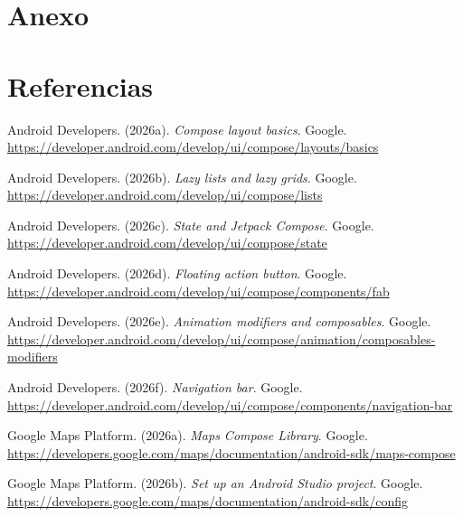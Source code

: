 \documentclass[12pt,a4paper]{article}
\begin{document}
\clearpage
\section{Anexo}
\vfill
\clearpage
\section{Referencias}

\setlength{\parindent}{0pt}

Android Developers. (2026a). \textit{Compose layout basics}. Google.\\
\url{https://developer.android.com/develop/ui/compose/layouts/basics}

Android Developers. (2026b). \textit{Lazy lists and lazy grids}. Google.\\
\url{https://developer.android.com/develop/ui/compose/lists}

Android Developers. (2026c). \textit{State and Jetpack Compose}. Google.\\
\url{https://developer.android.com/develop/ui/compose/state}

Android Developers. (2026d). \textit{Floating action button}. Google.\\
\url{https://developer.android.com/develop/ui/compose/components/fab}

Android Developers. (2026e). \textit{Animation modifiers and composables}. Google.\\
\url{https://developer.android.com/develop/ui/compose/animation/composables-modifiers}

Android Developers. (2026f). \textit{Navigation bar}. Google.\\
\url{https://developer.android.com/develop/ui/compose/components/navigation-bar}

Google Maps Platform. (2026a). \textit{Maps Compose Library}. Google.\\
\url{https://developers.google.com/maps/documentation/android-sdk/maps-compose}

Google Maps Platform. (2026b). \textit{Set up an Android Studio project}. Google.\\
\url{https://developers.google.com/maps/documentation/android-sdk/config}
\end{document}
